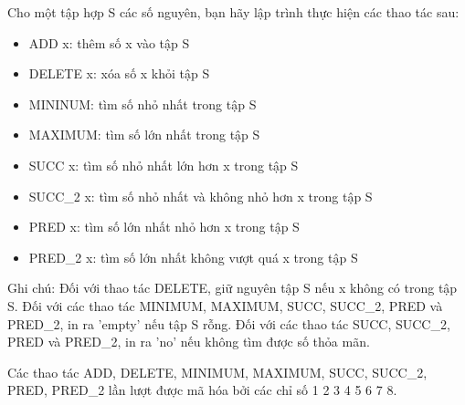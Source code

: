 Cho một tập hợp S các số nguyên, bạn hãy lập trình thực hiện các thao tác sau:  
\begin{itemize}
	\item     ADD x: thêm số x vào tập S   
	\item     DELETE x: xóa số x khỏi tập S   
	\item     MININUM: tìm số nhỏ nhất trong tập S   
	\item     MAXIMUM: tìm số lớn nhất trong tập S   
	\item     SUCC x: tìm số nhỏ nhất lớn hơn x trong tập S   
	\item     SUCC\_2 x: tìm số nhỏ nhất và không nhỏ hơn x trong tập S   
	\item     PRED x: tìm số lớn nhất nhỏ hơn x trong tập S   
	\item     PRED\_2 x: tìm số lớn nhất không vượt quá x trong tập S   
\end{itemize}

   Ghi chú: Đối với thao tác DELETE, giữ nguyên tập S nếu x không có trong tập S. Đối với các thao tác MINIMUM, MAXIMUM, SUCC, SUCC\_2, PRED và PRED\_2, in ra 'empty' nếu tập S rỗng. Đối với các thao tác SUCC, SUCC\_2, PRED và PRED\_2, in ra 'no' nếu không tìm được số thỏa mãn.  

   Các thao tác ADD, DELETE, MINIMUM, MAXIMUM, SUCC, SUCC\_2, PRED, PRED\_2 lần lượt được mã hóa bởi các chỉ số 1 2 3 4 5 6 7 8.